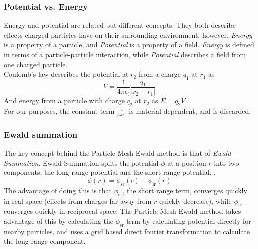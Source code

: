 \documentclass[pdftex,twoside,a4paper]{report}
\newcommand{\pmem}{Particle Mesh Ewald method}
\begin{document}
\subsubsection{Potential vs. Energy}
Energy and potential are related but different concepts. They both describe effects charged particles have on their surrounding environment, however, \emph{Energy} is a property of a particle, and \emph{Potential} is a property of a field. \emph{Energy} is defined in terms of a particle-particle interaction, while \emph{Potential} describes a field from one charged particle.\\
Coulomb's law describes the potential at $r_2$ from a charge $q_1$ at $r_1$ as 
\[V=\frac{1}{4\pi \epsilon_0} \frac{q_1}{|r_2 - r_1|}\]
And energy from a particle with charge $q_2$ at $r_2$ as $E = q_2 V$.\\
For our purposes, the constant term $\frac{1}{4\pi \epsilon_0}$ is material dependent, and is discarded.
\subsubsection{Ewald summation}
The key concept behind the \pmem{} is that of \emph{Ewald Summation}. Ewald Summation splits the potential $\phi$ at a position $r$ into two components, the long range potential and the short range potential. \cite{petersen:3668}.
\[
\phi(r) = \phi_{\text{sr}}(r) + \phi_{\text{lr}}(r)
\]
The advantage of doing this is that $\phi_{\text{sr}}$, the short range term, converges quickly in real space (effects from charges far away from $r$ quickly decrease), while $\phi_{\text{lr}}$ converges quickly in reciprocal space. The \pmem{} takes advantage of this by calculating the $\phi_{\text{sr}}$ term by calculating potential directly for nearby particles, and uses a grid based direct fourier transformation to calculate the long range component.
\end{document}
